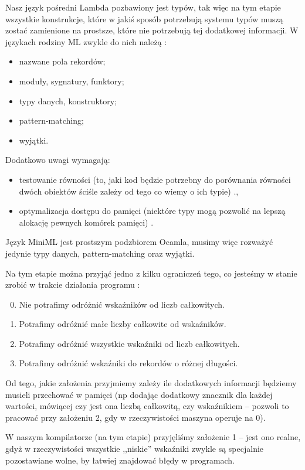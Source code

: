 \documentclass[11pt]{scrartcl}
\begin{document}
Nasz język pośredni Lambda pozbawiony jest typów, tak więc na tym etapie
wszystkie konstrukcje, które w jakiś sposób potrzebują systemu typów muszą
zostać zamienione na prostsze, które nie potrzebują tej dodatkowej informacji.
W językach rodziny ML zwykle do nich należą \cite[Chapter 4: ML-specific optimizations]{Appel}:
\begin{itemize}
\item nazwane pola rekordów;
\item moduły, sygnatury, funktory;
\item typy danych, konstruktory;
\item pattern-matching;
\item wyjątki.
\end{itemize}
Dodatkowo uwagi wymagają:
\begin{itemize}
\item testowanie równości (to, jaki kod będzie potrzebny do porównania
  równości dwóch obiektów ściśle zależy od tego co wiemy o ich typie)
  \cite[Chapter 4.3: Equality]{Appel}.,
\item optymalizacja dostępu do pamięci (niektóre typy mogą pozwolić na lepszą alokację
  pewnych komórek pamięci) \cite[Chapter 4.4: Unboxed updates]{Appel}.
\end{itemize}

Język MiniML jest prostszym podzbiorem Ocamla, musimy więc rozważyć jedynie typy
danych, pattern-matching oraz wyjątki.

Na tym etapie można przyjąć jedno z kilku ograniczeń tego, co jesteśmy w stanie
zrobić w trakcie działania programu \cite[Chapter 4.1: Data representation]{Appel}:
\begin{enumerate}
\setcounter{enumi}{-1}
\item Nie potrafimy odróżnić wskaźników od liczb całkowitych.
\item Potrafimy odróżnić małe liczby całkowite od wskaźników.
\item Potrafimy odróżnić wszystkie wskaźniki od liczb całkowitych.
\item Potrafimy odróżnić wskaźniki do rekordów o różnej długości.
\end{enumerate}
Od tego, jakie założenia przyjmiemy zależy ile dodatkowych informacji będziemy
musieli przechować w pamięci (np dodając dodatkowy znacznik dla każdej wartości,
mówiącej czy jest ona liczbą całkowitą, czy wskaźnikiem -- pozwoli to pracować
przy założeniu 2, gdy w rzeczywistości maszyna operuje na 0).

W naszym kompilatorze (na tym etapie) przyjęliśmy założenie 1 -- jest ono realne,
gdyż w rzeczywistości wszystkie ,,niskie'' wskaźniki zwykle są specjalnie
pozostawiane wolne, by łatwiej znajdować błędy w programach.
\end{document}
